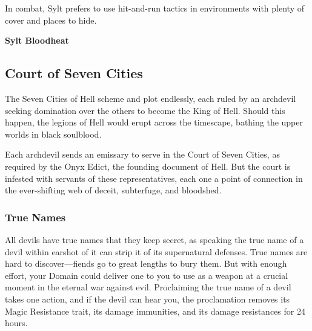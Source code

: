 \documentclass[10pt,a4paper,twoside,bg=print,twocolumn,openany,nodeprecatedcode]{dndbook}
\begin{document}
In combat, Sylt prefers to use hit-and-run tactics in environments with plenty of cover and places to hide.

\textbf{Sylt Bloodheat}

\subsection{Court of Seven Cities}
The Seven Cities of Hell scheme and plot endlessly, each ruled by an archdevil seeking domination over the others to become the King of Hell. Should this happen, the legions of Hell would erupt across the timescape, bathing the upper worlds in black soulblood.

Each archdevil sends an emissary to serve in the Court of Seven Cities, as required by the Onyx Edict, the founding document of Hell. But the court is infested with servants of these representatives, each one a point of connection in the ever-shifting web of deceit, subterfuge, and bloodshed.

\subsubsection{True Names}
All devils have true names that they keep secret, as speaking the true name of a devil within earshot of it can strip it of its supernatural defenses. True names are hard to discover—fiends go to great lengths to bury them. But with enough effort, your Domain could deliver one to you to use as a weapon at a crucial moment in the eternal war against evil. Proclaiming the true name of a devil takes one action, and if the devil can hear you, the proclamation removes its Magic Resistance trait, its damage immunities, and its damage resistances for 24 hours.
\end{document}
